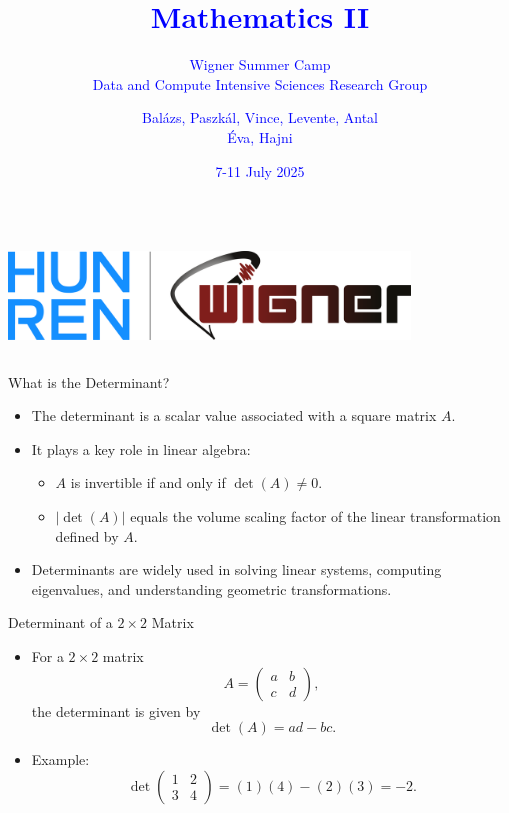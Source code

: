 \documentclass{beamer}
\title{\textcolor{blue}{Mathematics II}}
\subtitle{\textcolor{blue}{Wigner Summer Camp \\ Data and Compute Intensive Sciences Research Group}}
\author{\textcolor{blue}{Balázs, Paszkál, Vince, Levente, Antal \\ Éva, Hajni}}
\date{\textcolor{blue}{7-11 July 2025}}
\begin{document}
	\begin{frame}
		\titlepage
		\begin{columns}
			\centering
			\centering
			\includegraphics[width=0.8\textwidth]{../img/logo.png}
			\centering
		\end{columns}
	\end{frame}

	\begin{frame}{What is the Determinant?}
		\begin{itemize}
		  \item The determinant is a scalar value associated with a square matrix \( A \).
		  \item It plays a key role in linear algebra:
		  \begin{itemize}
		    \item \( A \) is invertible if and only if \( \det(A) \neq 0 \).
		    \item \( |\det(A)| \) equals the volume scaling factor of the linear transformation defined by \( A \).
		  \end{itemize}
		  \item Determinants are widely used in solving linear systems, computing eigenvalues, and understanding geometric transformations.
		\end{itemize}
	\end{frame}

	\begin{frame}{Determinant of a \(2 \times 2\) Matrix}
		\begin{itemize}
		  \item For a \(2 \times 2\) matrix
		  \begin{equation}
		    A =
		    \begin{pmatrix} a & b \\ c & d \end{pmatrix},
		  \end{equation}
		  the determinant is given by
		  \begin{equation}
		    \det(A) = ad - bc. \label{eq:det2x2}
		  \end{equation}
		  \item Example:
		  \begin{equation}
		    \det
		    \begin{pmatrix} 1 & 2 \\ 3 & 4 \end{pmatrix} =
		    (1)(4) - (2)(3) = -2. \label{eq:det2x2_example}
		  \end{equation}
		\end{itemize}
	\end{frame}
\end{document}
